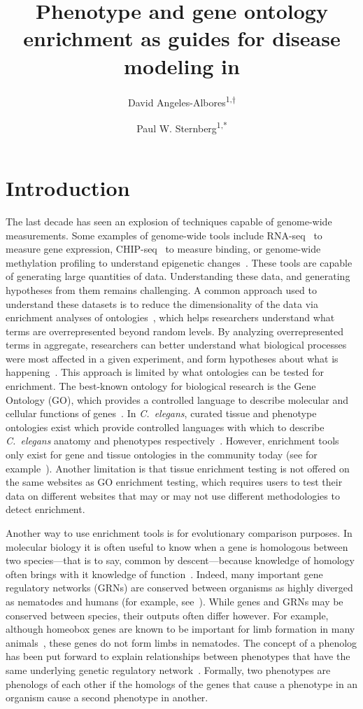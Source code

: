 \documentclass[10pt,letterpaper,twocolumn]{article}
\title{
  \Large
  \textbf{
  Phenotype and gene ontology enrichment as guides for disease modeling
  in \cel{}
          }
}
\author{David Angeles-Albores\textsuperscript{1,$\dagger{}$}
\and{}
Paul W. Sternberg\textsuperscript{1,*}
}
\newcommand{\cel}{\emph{C.~elegans}}
\begin{document}

\twocolumn[
\maketitle


]
\nolinenumbers{}

\section*{Introduction}
The last decade has seen an explosion of techniques capable of genome-wide
measurements. Some examples of genome-wide tools include RNA-seq~\cite{} to
measure gene expression, CHIP-seq~\cite{} to measure binding, or genome-wide
methylation profiling to understand epigenetic changes~\cite{}. These tools are capable
of generating large quantities of data. Understanding these data, and generating
hypotheses from them remains challenging. A common approach used to understand
these datasets is to reduce the dimensionality of the data via enrichment
analyses of ontologies~\cite{}, which helps researchers understand what terms are
overrepresented beyond random levels. By analyzing overrepresented terms in
aggregate, researchers can better understand what biological processes were most
affected in a given experiment, and form hypotheses about what is
happening~\cite{}.
This approach is limited by what ontologies can be tested for enrichment.
The best-known ontology for biological research is the Gene Ontology (GO), which
provides a controlled language to describe molecular and cellular functions of
genes~\cite{}. In \cel{}, curated tissue and phenotype ontologies exist which provide
controlled languages with which to describe \cel{} anatomy and phenotypes
respectively~\cite{}. However, enrichment tools only exist for gene and tissue ontologies
in the community today (see for example~\cite{}). Another limitation is that
tissue enrichment testing is not offered on the same websites as GO enrichment
testing, which requires users to test their data on different websites that may
or may not use different methodologies to detect enrichment.

Another way to use enrichment tools is for evolutionary comparison purposes.
In molecular biology it is often useful to know when a gene is homologous
between two species---that is to say, common by descent---because knowledge of
homology often brings with it knowledge of function~\cite{}. Indeed, many
important gene regulatory networks (GRNs) are conserved between organisms as
highly diverged as nematodes and humans (for example, see~\cite{}). While genes
and GRNs may be conserved between species, their outputs often differ however.
For example, although homeobox genes are known to be important for limb
formation in many animals~\cite{}, these genes do not form limbs in nematodes.
The concept of a phenolog has been put forward to explain relationships between
phenotypes that have the same underlying genetic regulatory network~\cite{}.
Formally, two phenotypes are phenologs of each other if the homologs of the
genes that cause a phenotype in an organism cause a second phenotype in another.
\end{document}
